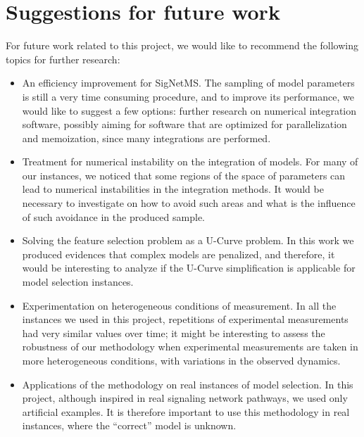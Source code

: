 \section{Suggestions for future work}
For future work related to this project, we would like to recommend the
following topics for further research:
\begin{itemize}
    \item{An efficiency improvement for SigNetMS.} The sampling of model
        parameters is still a very time consuming procedure, and to
        improve its performance, we would like to suggest a few options:
        further research on numerical integration software, possibly
        aiming for software that are optimized for parallelization and
        memoization, since many integrations are performed.
    \item{Treatment for numerical instability on the integration of
        models. For many of our instances, we noticed that some regions
        of the space of parameters can lead to numerical instabilities
        in the integration methods. It would be necessary to investigate
        on how to avoid such areas and what is the influence of such
        avoidance in the produced sample.}
    \item{Solving the feature selection problem as a U-Curve problem. In
        this work we produced evidences that complex models are
        penalized, and therefore, it would be interesting to analyze if
        the U-Curve simplification is applicable for model selection
        instances.}
    \item{Experimentation on heterogeneous conditions of measurement. In
        all the instances we used in this project, repetitions of 
        experimental measurements had very similar values over time; it
        might be interesting to assess the robustness of our methodology
        when experimental measurements are taken in more heterogeneous
        conditions, with variations in the observed dynamics.}
    \item{Applications of the methodology on real instances of model
        selection. In this project, although inspired in real signaling
        network pathways, we used only artificial examples. It is
        therefore important to use this methodology in real instances,
        where the ``correct'' model is unknown.}
\end{itemize}
